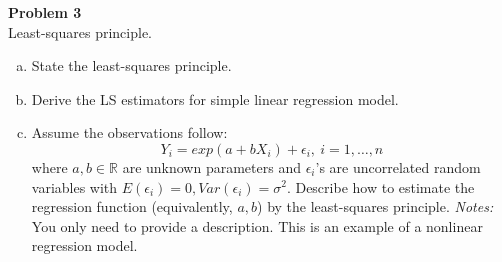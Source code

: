 \documentclass{article}
\newenvironment{problem}[2][Problem]
    { \begin{mdframed}[backgroundcolor=gray!20] \textbf{#1 #2} \\}
    {  \end{mdframed}}
\begin{document}
\begin{problem}{3}
Least-squares principle.
\begin{enumerate}[(a)]
\item State the least-squares principle.
\item Derive the LS estimators for simple linear regression model. 
\item Assume the observations follow:
$$Y_i = exp(a + b X_i) + \epsilon_i, \ i = 1, \ldots, n$$
where $a,b \in  \mathbb R$ are unknown parameters and $\epsilon_i$'s are uncorrelated random variables
with \newline
$E(\epsilon_i) = 0,Var(\epsilon_i) = \sigma^2$. Describe how to estimate the regression function
(equivalently, $a,b$) by the least-squares principle. \emph{Notes:} You only need to provide
a description. This is an example of a nonlinear regression model.
\end{enumerate}
\end{problem}
\end{document}
